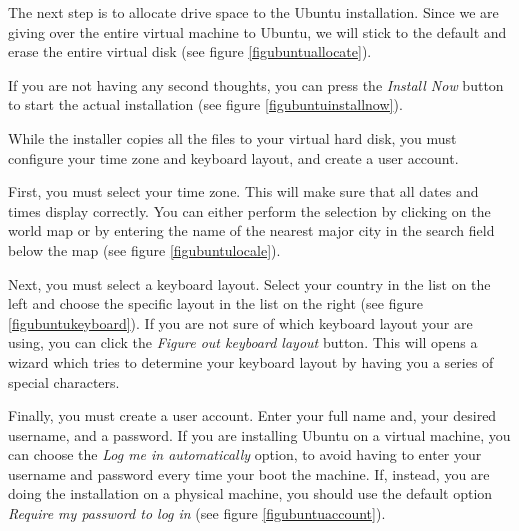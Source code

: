 \documentclass[ebook,10pt,twoside,openright]{memoir}
\begin{document}

The next step is to allocate drive space to the Ubuntu installation. Since we are giving over the entire virtual machine to Ubuntu, we will stick to the default and erase the entire virtual disk (see figure \ref{figubuntuallocate}).


If you are not having any second thoughts, you can press the \emph{Install Now} button to start the actual installation (see figure \ref{figubuntuinstallnow}).


While the installer copies all the files to your virtual hard disk, you must configure your time zone and keyboard layout, and create a user account.

First, you must select your time zone. This will make sure that all dates and times display correctly. You can either perform the selection by clicking on the world map or by entering the name of the nearest major city in the search field below the map (see figure \ref{figubuntulocale}).


Next, you must select a keyboard layout. Select your country in the list on the left and choose the specific layout in the list on the right (see figure \ref{figubuntukeyboard}). If you are not sure of which keyboard layout your are using, you can click the \emph{Figure out keyboard layout} button. This will opens a wizard which tries to determine your keyboard layout by having you a series of special characters.


Finally, you must create a user account. Enter your full name and, your desired username, and a password. If you are installing Ubuntu on a virtual machine, you can choose the \emph{Log me in automatically} option, to avoid having to enter your username and password every time your boot the machine. If, instead, you are doing the installation on a physical machine, you should use the default option \emph{Require my password to log in} (see figure \ref{figubuntuaccount}).
\end{document}
